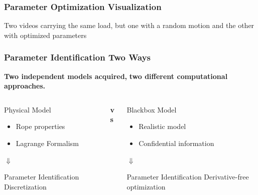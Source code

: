 \begin{frame}
    \frametitle{Parameter Optimization Visualization}
    Two videos carrying the same load, but one with a random motion and the other with optimized parameters
\end{frame}



		
		
\begin{frame}
    \frametitle{Parameter Identification Two Ways}
    \vspace{0.2cm}
    \textbf{Two independent models acquired,}\newline
    \textbf{two different computational approaches.}
    \vspace{0.5cm}
    \begin{columns}[onlytextwidth]
        \begin{column}{0.4\textwidth}
            \begin{block}{Physical Model}
                \begin{itemize}
                    \item{Rope properties}
                    \item{Lagrange Formalism}
                \end{itemize}
            \end{block}
            
            $\Downarrow$
            
            \begin{block}{Parameter Identification}
            Discretization
            \end{block}
        \end{column}
        
        \begin{column}{0.05\textwidth}
        \textbf{vs}
        \end{column}
        
        \begin{column}{0.4\textwidth}
            \begin{exampleblock}{Blackbox Model}
                \begin{itemize}
                    \item{Realistic model}
                    \item{Confidential information}
                \end{itemize}
            \end{exampleblock}
            
            $\Downarrow$
            
            \begin{exampleblock}{Parameter Identification}
            Derivative-free optimization
            \end{exampleblock}
        \end{column}
    \end{columns}
\end{frame}		
		

